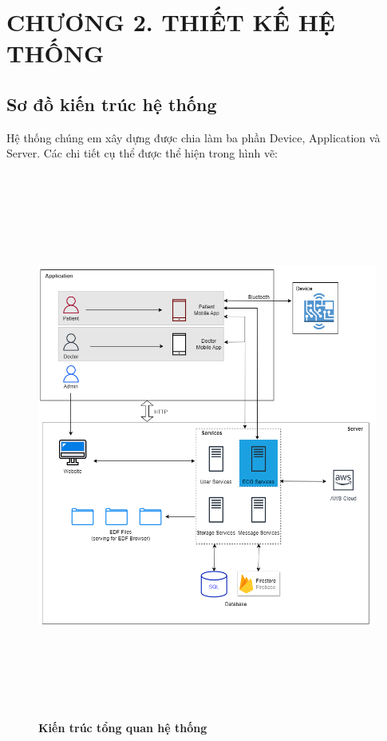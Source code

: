 
\section*{CHƯƠNG 2. THIẾT KẾ HỆ THỐNG}
\setcounter{section}{2}
\setcounter{subsection}{0} %
\setcounter{table}{0} %
\setcounter{figure}{0} %

\subsection{Sơ đồ kiến trúc hệ thống}
Hệ thống chúng em xây dựng được chia làm ba phần Device, Application và Server. Các chi tiết cụ thể được thể hiện trong
hình vẽ:

\begin{figure}[H]
  \centering
  \includegraphics[width=16cm,height=18cm]{Images/system/fmECG_architecture-System Architecture.drawio.png}
  \caption[Kiến trúc tổng quan hệ thống]{\bfseries \fontsize{12pt}{0pt}\selectfont Kiến trúc tổng quan hệ thống}
  \label{fmECG_architecture-System} %
\end{figure}


